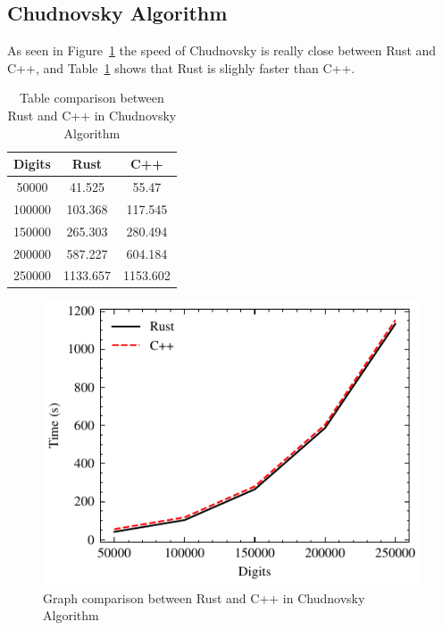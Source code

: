 \documentclass[10pt]{IEEEtran}
\begin{document}
\subsection{Chudnovsky Algorithm}
As seen in Figure~\ref{pi-graph} the speed of Chudnovsky is really close between Rust and C++, and Table~\ref{pi-table} shows that Rust is slighly faster than C++.
\begin{table}[!ht]
    \centering
    \begin{tabular}{|c|cc|}
        \hline
        \rowcolor{lightgray}
            Digits & Rust & C++ \\ \hline
            50000 & 41.525 & 55.47 \\ 
            100000 & 103.368 & 117.545 \\ 
            150000 & 265.303 & 280.494 \\ 
            200000 & 587.227 & 604.184 \\ 
            250000 & 1133.657 & 1153.602 \\ \hline
        \end{tabular}
    \caption{\label{pi-table}Table comparison between Rust and C++ in Chudnovsky Algorithm}
\end{table}
\begin{figure}[h]
    \centering
    \includegraphics{piplot}
    \caption{\label{pi-graph}Graph comparison between Rust and C++ in Chudnovsky Algorithm}
\end{figure}
\end{document}
